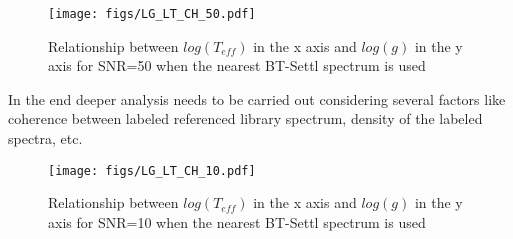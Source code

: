 {\clearpage 

\begin{figure}
 \begin{center}
 \texttt{[image: figs/LG\_LT\_CH\_50.pdf]}
 \caption{Relationship between $log(T_{eff}) $ in the x axis 
 and $log(g)$ in the y axis for SNR=50 when 
 the nearest BT-Settl spectrum is used}
 \label{fig:lg_lt_ch_50}
 \end{center}
\end{figure}

In the end deeper analysis needs to be carried out considering
several factors like coherence between labeled referenced 
library spectrum, density of the labeled spectra, etc.

\begin{figure}
 \begin{center}
 \texttt{[image: figs/LG\_LT\_CH\_10.pdf]}
 \caption{Relationship between $log(T_{eff}) $ in the x axis 
 and $log(g)$ in the y axis for SNR=10 when 
 the nearest BT-Settl spectrum is used}
 \label{fig:lg_lt_ch_10}
 \end{center}
\end{figure}


}
